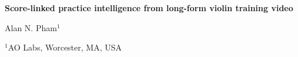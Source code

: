 \documentclass[12pt,letterpaper]{article}
\begin{document}
\linenumbers
\thispagestyle{empty}

\begin{center}
    \vspace*{-0.6em}

    {\fontsize{20}{22}\selectfont\bfseries\color{SumiInk}
    Score-linked practice intelligence from long-form violin training video\par}

    \vspace{0.95em}

    {\normalsize\color{SumiInk}
    Alan N. Pham$^{1}$\par}

    \vspace{0.38em}

    {\small\color{DustyTaupe}
    $^{1}$AO Labs, Worcester, MA, USA\par}
\end{center}
\end{document}
